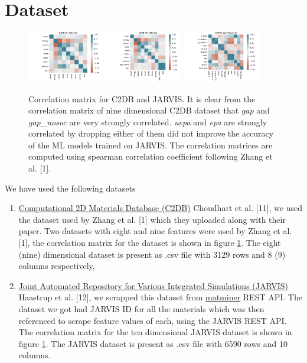 \documentclass{article}
\begin{document}
\section{Dataset}
\label{sec:data}

\begin{figure}
	\centering
	\includegraphics[width = 0.3\textwidth]{figures/c_8}
	\includegraphics[width = 0.3\textwidth]{figures/c_9}
	\includegraphics[width = 0.3\textwidth]{figures/j_10}
	\caption{Correlation matrix for C2DB and JARVIS. It is clear from the correlation matrix of nine dimensional C2DB dataset that \emph{gap} and \emph{gap\_nosoc} are very strongly correlated. \emph{uepa} and \emph{epa} are strongly correlated by dropping either of them did not improve the accuracy of the ML models trained on JARVIS. The correlation matrices are computed using spearman correlation coefficient following Zhang et al. [1].}
	\label{fig:c2db_data}
\end{figure}

We have used the following datasets
\begin{enumerate}

	\item \href{https://cmr.fysik.dtu.dk/c2db/c2db.html}{Computational 2D Materials Database (C2DB)} Choudhart et al. [11], we used the dataset used by Zhang et al. [1] which they uploaded along with their paper. Two datasets with eight and nine features were used by Zhang et al. [1], the correlation matrix for the dataset is shown in figure \ref{fig:c2db_data}. The eight (nine) dimensional dataset is present as .csv file with 3129 rows and 8 (9) columns respectively, 
	\item \href{https://jarvis.nist.gov/}{Joint Automated Repository for Various Integrated Simulations (JARVIS)} Haastrup et al. [12], we scrapped this dataset from \href{https://hackingmaterials.lbl.gov/matminer/}{matminer} REST API. The dataset we got had JARVIS ID for all the materials which was then referenced to scrape feature values of each, using the JARVIS REST API. The correlation matrix for the ten dimensional JARVIS dataset is shown in figure \ref{fig:c2db_data}. The JARVIS dataset is present as .csv file with 6590 rows and 10 columns.

\end{enumerate}
\end{document}
